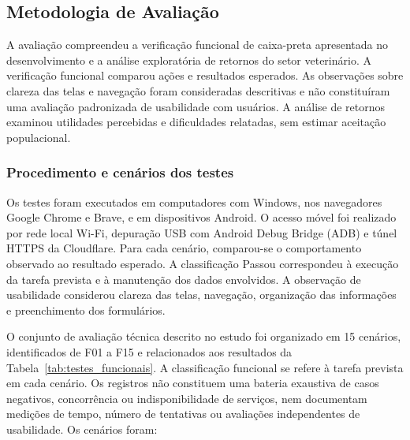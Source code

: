 \documentclass{UNESC}
\begin{document}
\subsection{Metodologia de Avaliação}

A avaliação compreendeu a verificação funcional de caixa-preta apresentada no desenvolvimento e a análise exploratória de retornos do setor veterinário. A verificação funcional comparou ações e resultados esperados. As observações sobre clareza das telas e navegação foram consideradas descritivas e não constituíram uma avaliação padronizada de usabilidade com usuários. A análise de retornos examinou utilidades percebidas e dificuldades relatadas, sem estimar aceitação populacional.

\subsubsection{Procedimento e cenários dos testes}

Os testes foram executados em computadores com Windows, nos navegadores Google Chrome e Brave, e em dispositivos Android. O acesso móvel foi realizado por rede local Wi-Fi, depuração USB com Android Debug Bridge (ADB) e túnel HTTPS da Cloudflare. Para cada cenário, comparou-se o comportamento observado ao resultado esperado. A classificação Passou correspondeu à execução da tarefa prevista e à manutenção dos dados envolvidos. A observação de usabilidade considerou clareza das telas, navegação, organização das informações e preenchimento dos formulários.

O conjunto de avaliação técnica descrito no estudo foi organizado em 15 cenários, identificados de F01 a F15 e relacionados aos resultados da Tabela~\ref{tab:testes_funcionais}. A classificação funcional se refere à tarefa prevista em cada cenário. Os registros não constituem uma bateria exaustiva de casos negativos, concorrência ou indisponibilidade de serviços, nem documentam medições de tempo, número de tentativas ou avaliações independentes de usabilidade. Os cenários foram:
\end{document}
